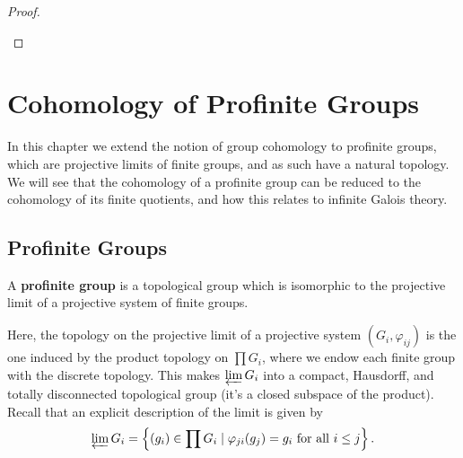 \documentclass[a4paper, oneside]{memoir}
\begin{document}
\begin{proof}
\begin{center}
\label{fig:SpSeq}
	\end{center}
\end{proof}

\chapter{Cohomology of Profinite Groups}

In this chapter we extend the notion of group cohomology to profinite groups, which are projective limits of finite groups, and as such have a natural topology. We will see that the cohomology of a profinite group can be reduced to the cohomology of its finite quotients, and how this relates to infinite Galois theory.

\section{Profinite Groups}
\begin{definition}
	A \textbf{profinite group} is a topological group which is isomorphic to the projective limit of a projective system of finite groups.
\end{definition}

Here, the topology on the projective limit of a projective system $(G_i,\varphi_{ij})$ is the one induced by the product topology on $\prod{G_i}$, where we endow each finite group with the discrete topology. This makes $\varprojlim{G_i}$ into a compact, Hausdorff, and totally disconnected topological group (it's a closed subspace of the product). Recall that an explicit description of the limit is given by
\[
	\varprojlim{G_i} = \left\{ (g_i) \in \prod{G_i} \mid \varphi_{ji}(g_j)=g_i \text{ for all } i\leq j \right\}.
\]
\end{document}
